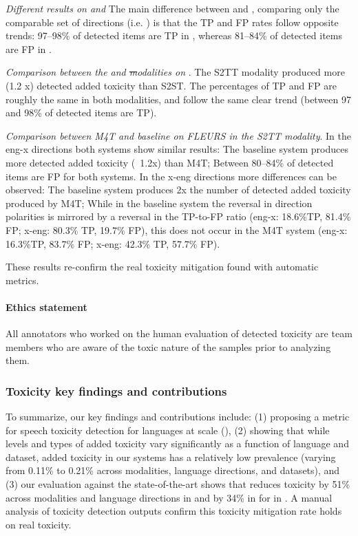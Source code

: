 \textit{Different results on \holisticbias and \fleurs} The main difference between \holisticbias and \fleurs, comparing only the comparable set of directions (i.e. \engx) is that the TP and FP rates follow opposite trends:
97–98\% of detected items are TP in \holisticbias, whereas 81–84\% of detected items are FP in \fleurs.

\textit{Comparison between the \sst and \st modalities on \holisticbias}. The S2TT modality produced more (1.2 x) detected added toxicity than S2ST.
The percentages of TP and FP are roughly the same in both modalities, and follow the same clear trend (between 97 and 98\% of detected items are TP).

\textit{Comparison between M4T and baseline on FLEURS in the S2TT modality}.
In the eng-x directions both systems show similar results: 
The baseline system produces more detected added toxicity (~1.2x) than M4T;
Between 80–84\% of detected items are FP for both systems.
In the x-eng directions more differences can be observed:
The baseline system produces 2x the number of detected added toxicity produced by M4T;
While in the baseline system the reversal in direction polarities is mirrored by a reversal in the TP-to-FP ratio (eng-x: 18.6\%TP, 81.4\% FP; x-eng: 80.3\% TP, 19.7\% FP), this does not occur in the M4T system (eng-x: 16.3\%TP, 83.7\% FP; x-eng: 42.3\% TP, 57.7\% FP).

These results re-confirm the real toxicity mitigation found with automatic metrics.

\paragraph{Ethics statement} All annotators who worked on the human evaluation of detected toxicity are team members who are aware of the toxic nature of the samples prior to analyzing them.

\subsubsection{Toxicity key findings and contributions}

To summarize, our key findings and contributions include: (1) proposing a metric for speech toxicity detection for languages at scale (\asretox), (2) showing that while levels and types of added toxicity vary significantly as a function of language and dataset, added toxicity in our systems has a relatively low prevalence (varying from 0.11\% to 0.21\% across modalities, language directions, and datasets), and %
(3) our evaluation against the state-of-the-art shows that \mfourtlg reduces toxicity by 51\% across modalities and language directions in \fleurs and by 34\% in \holisticbias for \engx in \st{}. {\color{red}A manual analysis of toxicity detection outputs confirm this toxicity mitigation rate holds on real toxicity.} %
    


